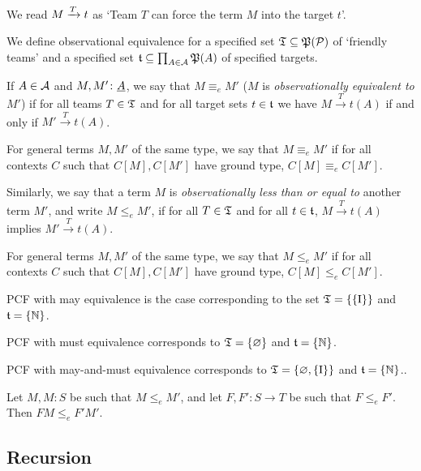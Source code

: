 \documentclass{article}
\begin{document}
We read $M\xrightarrow{T}t$ as `Team $T$ can force the term $M$ into the target $t$'.

\begin{definition}
  We define observational equivalence for a specified set $\mathfrak{T}\subseteq\mathfrak P(\mathcal P)$ of `friendly teams' and a specified set $\mathfrak t \subseteq \prod_{A\in{\mathcal{A}}}\mathfrak P(A)$ of specified targets.

  If $A\in{\mathcal{A}}$ and $M,M'\colon{\underline{A}}$, we say that $M\equiv_e M'$ ($M$ is \emph{observationally equivalent to $M'$}) if for all teams $T\in\mathfrak{T}$ and for all target sets $t\in\mathfrak t$ we have $M\xrightarrow{T}t(A)$ if and only if $M'\xrightarrow{T}t(A)$.

  For general terms $M,M'$ of the same type, we say that $M\equiv_e M'$ if for all contexts $C$ such that $C[M],C[M']$ have ground type, $C[M]\equiv_e C[M']$.
\end{definition}

\begin{definition}
  Similarly, we say that a term $M$ is \emph{observationally less than or equal to} another term $M'$, and write $M\le_e M'$, if for all $T\in\mathfrak{T}$ and for all $t\in\mathfrak t$, $M\xrightarrow{T}t(A)$ implies $M'\xrightarrow{T}t(A)$.

  For general terms $M,M'$ of the same type, we say that $M\le_e M'$ if for all contexts $C$ such that $C[M],C[M']$ have ground type, $C[M]\le_e C[M']$.
\end{definition}

\begin{example}
  PCF with may equivalence is the case corresponding to the set $\T=\{\{\RN{1}\}\}$ and $\mathfrak t=\{\mathbb{N}\}$.
  
  PCF with must equivalence corresponds to $\mathfrak{T}=\{\varnothing\}$ and $\mathfrak t=\{\mathbb{N}\}$.

  PCF with may-and-must equivalence corresponds to $\T=\{\emptyset, \{\RN{1}\}\}$ and $\mathfrak t=\{\mathbb{N}\}$..
\end{example}

\begin{lemma}
  Let $M,M:S$ be such that $M\le_e M'$, and let $F,F':S\to T$ be such that $F\le_e F'$.  
  Then $F M \le_e F' M'$.
\end{lemma}

\subsection{Recursion}
\end{document}
